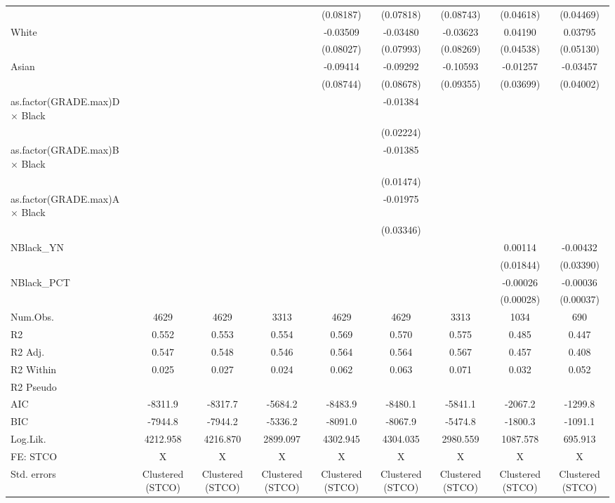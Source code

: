 \documentclass[
]{article}
\begin{document}
\begin{table}
{\begin{tabular}[t]{lcccccccc}
 &  &  &  & (0.08187) & (0.07818) & (0.08743) & (0.04618) & (0.04469)\\
White &  &  &  & -0.03509 & -0.03480 & -0.03623 & 0.04190 & 0.03795\\
 &  &  &  & (0.08027) & (0.07993) & (0.08269) & (0.04538) & (0.05130)\\
Asian &  &  &  & -0.09414 & -0.09292 & -0.10593 & -0.01257 & -0.03457\\
 &  &  &  & (0.08744) & (0.08678) & (0.09355) & (0.03699) & (0.04002)\\
as.factor(GRADE.max)D × Black &  &  &  &  & -0.01384 &  &  & \\
 &  &  &  &  & (0.02224) &  &  & \\
as.factor(GRADE.max)B × Black &  &  &  &  & -0.01385 &  &  & \\
 &  &  &  &  & (0.01474) &  &  & \\
as.factor(GRADE.max)A × Black &  &  &  &  & -0.01975 &  &  & \\
 &  &  &  &  & (0.03346) &  &  & \\
NBlack\_YN &  &  &  &  &  &  & 0.00114 & -0.00432\\
 &  &  &  &  &  &  & (0.01844) & (0.03390)\\
NBlack\_PCT &  &  &  &  &  &  & -0.00026 & -0.00036\\
 &  &  &  &  &  &  & (0.00028) & (0.00037)\\
\midrule
Num.Obs. & 4629 & 4629 & 3313 & 4629 & 4629 & 3313 & 1034 & 690\\
R2 & 0.552 & 0.553 & 0.554 & 0.569 & 0.570 & 0.575 & 0.485 & 0.447\\
R2 Adj. & 0.547 & 0.548 & 0.546 & 0.564 & 0.564 & 0.567 & 0.457 & 0.408\\
R2 Within & 0.025 & 0.027 & 0.024 & 0.062 & 0.063 & 0.071 & 0.032 & 0.052\\
R2 Pseudo &  &  &  &  &  &  &  & \\
AIC & -8311.9 & -8317.7 & -5684.2 & -8483.9 & -8480.1 & -5841.1 & -2067.2 & -1299.8\\
BIC & -7944.8 & -7944.2 & -5336.2 & -8091.0 & -8067.9 & -5474.8 & -1800.3 & -1091.1\\
Log.Lik. & 4212.958 & 4216.870 & 2899.097 & 4302.945 & 4304.035 & 2980.559 & 1087.578 & 695.913\\
FE: STCO & X & X & X & X & X & X & X & X\\
Std. errors & Clustered (STCO) & Clustered (STCO) & Clustered (STCO) & Clustered (STCO) & Clustered (STCO) & Clustered (STCO) & Clustered (STCO) & Clustered (STCO)\\

\end{tabular}}
\end{table}
\end{document}
